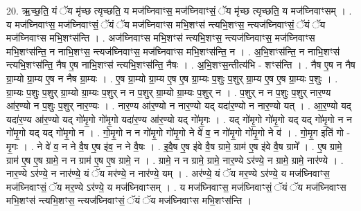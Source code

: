\documentclass[17pt]{extarticle}
\begin{document}
20. ऋ॒च्छ॒ति॒ यं ॅय मृ॑च्छ त्यृच्छति॒ य मज॑घ्निवाꣳस॒ मज॑घ्निवाꣳसं॒ ॅय मृ॑च्छ त्यृच्छति॒ य मज॑घ्निवाꣳसम् । . य मज॑घ्निवाꣳस॒ मज॑घ्निवाꣳसं॒ ॅयं ॅय मज॑घ्निवाꣳस मभि॒शꣳस॑ न्त्यभि॒शꣳस॒ न्त्यज॑घ्निवाꣳसं॒ ॅयं ॅय मज॑घ्निवाꣳस मभि॒शꣳस॑न्ति । . अज॑घ्निवाꣳस मभि॒शꣳस॑ न्त्यभि॒शꣳस॒ न्त्यज॑घ्निवाꣳस॒ मज॑घ्निवाꣳस मभि॒शꣳस॑न्ति॒ न नाभि॒शꣳस॒ न्त्यज॑घ्निवाꣳस॒ मज॑घ्निवाꣳस मभि॒शꣳस॑न्ति॒ न । . अ॒भि॒शꣳस॑न्ति॒ न नाभि॒शꣳस॑ न्त्यभि॒शꣳस॑न्ति॒ नैष ए॒ष नाभि॒शꣳस॑ न्त्यभि॒शꣳस॑न्ति॒ नैषः । . अ॒भि॒शꣳस॒न्तीत्य॑भि - शꣳस॑न्ति । . नैष ए॒ष न नैष ग्रा॒म्यो ग्रा॒म्य ए॒ष न नैष ग्रा॒म्यः । . ए॒ष ग्रा॒म्यो ग्रा॒म्य ए॒ष ए॒ष ग्रा॒म्यः प॒शुः प॒शुर् ग्रा॒म्य ए॒ष ए॒ष ग्रा॒म्यः प॒शुः । . ग्रा॒म्यः प॒शुः प॒शुर् ग्रा॒म्यो ग्रा॒म्यः प॒शुर् न न प॒शुर् ग्रा॒म्यो ग्रा॒म्यः प॒शुर् न । . प॒शुर् न न प॒शुः प॒शुर् नार॒ण्य आ॑र॒ण्यो न प॒शुः प॒शुर् नार॒ण्यः । . नार॒ण्य आ॑र॒ण्यो न नार॒ण्यो यद् यदा॑र॒ण्यो न नार॒ण्यो यत् । . आ॒र॒ण्यो यद् यदा॑र॒ण्य आ॑र॒ण्यो यद् गो॑मृ॒गो गो॑मृ॒गो यदा॑र॒ण्य आ॑र॒ण्यो यद् गो॑मृ॒गः । . यद् गो॑मृ॒गो गो॑मृ॒गो यद् यद् गो॑मृ॒गो न न गो॑मृ॒गो यद् यद् गो॑मृ॒गो न । . गो॒मृ॒गो न न गो॑मृ॒गो गो॑मृ॒गो ने वे॑ व॒ न गो॑मृ॒गो गो॑मृ॒गो ने व॑ । . गो॒मृ॒ग इति॑ गो - मृ॒गः । . ने वे॑ व॒ न ने वै॒ष ए॒ष इ॑व॒ न ने वै॒षः । . इ॒वै॒ष ए॒ष इ॑वे वै॒ष ग्रामे॒ ग्राम॑ ए॒ष इ॑वे वै॒ष ग्रामे᳚ । . ए॒ष ग्रामे॒ ग्राम॑ ए॒ष ए॒ष ग्रामे॒ न न ग्राम॑ ए॒ष ए॒ष ग्रामे॒ न । . ग्रामे॒ न न ग्रामे॒ ग्रामे॒ नार॒ण्ये ऽर॑ण्ये॒ न ग्रामे॒ ग्रामे॒ नार॑ण्ये । . नार॒ण्ये ऽर॑ण्ये॒ न नार॑ण्ये॒ यं ॅय मर॑ण्ये॒ न नार॑ण्ये॒ यम् । . अर॑ण्ये॒ यं ॅय मर॒ण्ये ऽर॑ण्ये॒ य मज॑घ्निवाꣳस॒ मज॑घ्निवाꣳसं॒ ॅय मर॒ण्ये ऽर॑ण्ये॒ य मज॑घ्निवाꣳसम् । . य मज॑घ्निवाꣳस॒ मज॑घ्निवाꣳसं॒ ॅयं ॅय मज॑घ्निवाꣳस मभि॒शꣳस॑ न्त्यभि॒शꣳस॒ न्त्यज॑घ्निवाꣳसं॒ ॅयं ॅय मज॑घ्निवाꣳस मभि॒शꣳस॑न्ति । \newline
\end{document}
